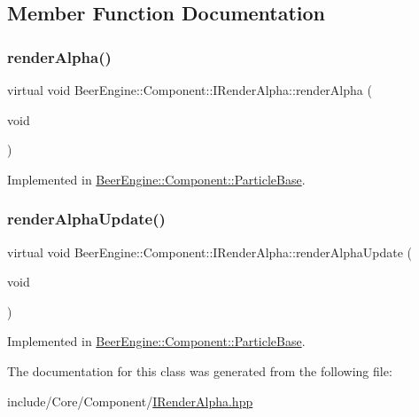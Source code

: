 \subsection{Member Function Documentation}
\mbox{\label{class_beer_engine_1_1_component_1_1_i_render_alpha_a3797df36149a8a8416ef24406923f068}} 
\subsubsection{\texorpdfstring{render\+Alpha()}{renderAlpha()}}
{\footnotesize\ttfamily virtual void Beer\+Engine\+::\+Component\+::\+I\+Render\+Alpha\+::render\+Alpha (\begin{DoxyParamCaption}\item[{void}]{ }\end{DoxyParamCaption})\hspace{0.3cm}{\ttfamily [pure virtual]}}



Implemented in \mbox{\hyperlink{class_beer_engine_1_1_component_1_1_particle_base_ab891afa6a5b2c99ffe94691bb5419588}{Beer\+Engine\+::\+Component\+::\+Particle\+Base}}.

\mbox{\label{class_beer_engine_1_1_component_1_1_i_render_alpha_ad0fd47a02cc63152b25dbfdb4b2639fa}} 
\subsubsection{\texorpdfstring{render\+Alpha\+Update()}{renderAlphaUpdate()}}
{\footnotesize\ttfamily virtual void Beer\+Engine\+::\+Component\+::\+I\+Render\+Alpha\+::render\+Alpha\+Update (\begin{DoxyParamCaption}\item[{void}]{ }\end{DoxyParamCaption})\hspace{0.3cm}{\ttfamily [pure virtual]}}



Implemented in \mbox{\hyperlink{class_beer_engine_1_1_component_1_1_particle_base_a0cecaefb92ed219eb0ddc2771c513446}{Beer\+Engine\+::\+Component\+::\+Particle\+Base}}.



The documentation for this class was generated from the following file\+:\begin{DoxyCompactItemize}
\item 
include/\+Core/\+Component/\mbox{\hyperlink{_i_render_alpha_8hpp}{I\+Render\+Alpha.\+hpp}}\end{DoxyCompactItemize}
